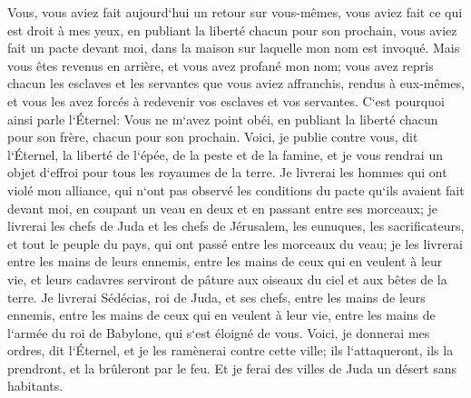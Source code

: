 \verse Vous, vous aviez fait aujourd`hui un retour sur vous-mêmes, vous aviez fait ce qui est droit à mes yeux, en publiant la liberté chacun pour son prochain, vous aviez fait un pacte devant moi, dans la maison sur laquelle mon nom est invoqué. 
\verse Mais vous êtes revenus en arrière, et vous avez profané mon nom; vous avez repris chacun les esclaves et les servantes que vous aviez affranchis, rendus à eux-mêmes, et vous les avez forcés à redevenir vos esclaves et vos servantes. 
\verse C`est pourquoi ainsi parle l`Éternel: Vous ne m`avez point obéi, en publiant la liberté chacun pour son frère, chacun pour son prochain. Voici, je publie contre vous, dit l`Éternel, la liberté de l`épée, de la peste et de la famine, et je vous rendrai un objet d`effroi pour tous les royaumes de la terre. 
\verse Je livrerai les hommes qui ont violé mon alliance, qui n`ont pas observé les conditions du pacte qu`ils avaient fait devant moi, en coupant un veau en deux et en passant entre ses morceaux; 
\verse je livrerai les chefs de Juda et les chefs de Jérusalem, les eunuques, les sacrificateurs, et tout le peuple du pays, qui ont passé entre les morceaux du veau; 
\verse je les livrerai entre les mains de leurs ennemis, entre les mains de ceux qui en veulent à leur vie, et leurs cadavres serviront de pâture aux oiseaux du ciel et aux bêtes de la terre. 
\verse Je livrerai Sédécias, roi de Juda, et ses chefs, entre les mains de leurs ennemis, entre les mains de ceux qui en veulent à leur vie, entre les mains de l`armée du roi de Babylone, qui s`est éloigné de vous. 
\verse Voici, je donnerai mes ordres, dit l`Éternel, et je les ramènerai contre cette ville; ils l`attaqueront, ils la prendront, et la brûleront par le feu. Et je ferai des villes de Juda un désert sans habitants. 

